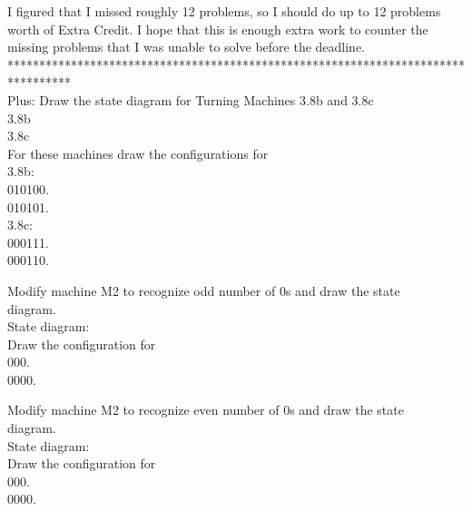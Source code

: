 \documentclass[12pt]{article}
\begin{document}
I figured that I missed roughly 12 problems, so I should do up to 12 problems
worth of Extra Credit. I hope that this is enough extra work to counter the
missing problems that I was unable to solve before the deadline. \\

********************************************************************************** \\


\pagebreak
Plus: Draw the state diagram for Turning Machines 3.8b and 3.8c \\
3.8b \\

3.8c \\

For these machines draw the configurations for \\
3.8b: \\
010100. \\

010101. \\

3.8c: \\
000111. \\

000110. \\

\pagebreak

Modify machine M2 to recognize odd number of 0s and draw the state \\
diagram. \\

State diagram: \\

Draw the configuration for \\
000. \\

0000. \\

\pagebreak

Modify machine M2 to recognize even number of 0s and draw the state \\
diagram. \\

State diagram: \\

Draw the configuration for \\
000. \\

0000. \\
\end{document}
